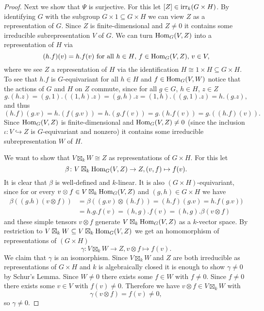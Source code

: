 \begin{proof}
  Next we show that $\Psi$ is surjective. For this let $[Z] \in \operatorname{irr}_k(G \times H)$. By identifying $G$ with the subgroup $G \times 1 \subseteq G \times H$ we can view $Z$ as a representation of $G$. Since $Z$ is finite-dimensional and $Z \neq 0$ it contains some irreducible subrepresentation $V$ of $G$. We can turn $\operatorname{Hom}_G(V, Z)$ into a representation of $H$ via
  \[
    (h.f)(v) = h.f(v) \text{ for all } h \in H\text{, }f \in \operatorname{Hom}_G(V, Z)\text{, }v \in V,
  \]
  where we see $Z$ a representation of $H$ via the identification $H \cong 1 \times H \subseteq G \times H$. To see that $h.f$ is $G$-equivariant for all $h \in H$ and $f \in \operatorname{Hom}_G(V,W)$ notice that the actions of $G$ and $H$ on $Z$ commute, since for all $g \in G$, $h \in H$, $z \in Z$
  \[
    g.(h.z) = (g,1).((1,h).z) = (g,h).z = (1,h).((g,1).z) = h.(g.z),
  \]
  and thus
  \[
    (h.f)(g.v) = h.(f(g.v)) = h.(g.f(v)) = g.(h.f(v)) = g.((h.f)(v)).
  \]
  Since $\operatorname{Hom}_G(V, Z)$ is finite-dimensional and $\operatorname{Hom}_G(V, Z) \neq 0$ (since the inclusion $\iota \colon V \hookrightarrow Z$ is $G$-equivariant and nonzero) it contains some irreducible subrepresentation $W$ of $H$.
  
  We want to show that $V \boxtimes_k W \cong Z$ as representations of $G \times H$. For this let
  \[
    \beta \colon V \boxtimes_k \operatorname{Hom}_G(V,Z) \to Z, (v, f) \mapsto f(v).
  \]
  It is clear that $\beta$ is well-defined and $k$-linear. It is also $(G \times H)$-equivariant, since for or every $v \otimes f \in V \boxtimes_k \operatorname{Hom}_G(V,Z)$ and $(g,h) \in G \times H$ we have
  \begin{align*}
    \beta((g.h)(v \otimes f))
    &= \beta((g.v) \otimes (h.f))
    = (h.f)(g.v)
    = h.f(g.v)) \\
    &= h.g.f(v)
    = (h,g).f(v)
    = (h,g).\beta(v \otimes f)
  \end{align*}
  and these simple tensors $v \otimes f$ generate $V \boxtimes_k \operatorname{Hom}_G(V,Z)$ as a $k$-vector space. By restriction to $V \boxtimes_k W \subseteq V \boxtimes_k \operatorname{Hom}_G(V,Z)$ we get an homomorphism of representations of $(G \times H)$
  \[
    \gamma \colon V \boxtimes_k W \to Z, v \otimes f \mapsto f(v).
  \]
  We claim that $\gamma$ is an isomorphism. Since $V \boxtimes_k W$ and $Z$ are both irreducible as representations of $G \times H$ and $k$ is algebraically closed it is enough to show $\gamma \neq 0$ by Schur’s Lemma. Since $W \neq 0$ there exists some $f \in W$ with $f \neq 0$. Since $f \neq 0$ there exists some $v \in V$ with $f(v) \neq 0$. Therefore we have $v \otimes f \in V \boxtimes_k W$ with
  \[
    \gamma(v \otimes f) = f(v) \neq 0,
  \]
  so $\gamma \neq 0$.
  

\end{proof}
